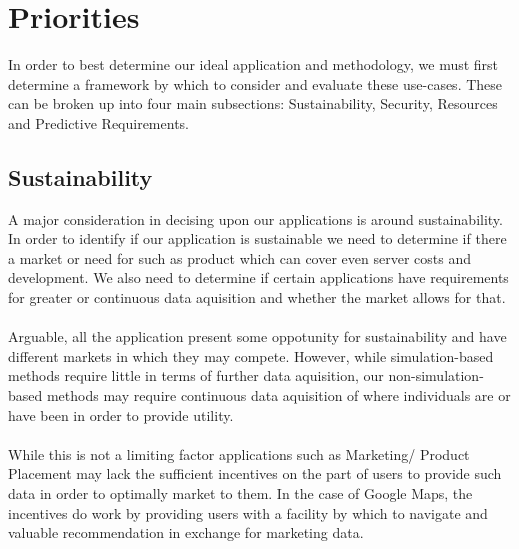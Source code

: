 \documentclass[12pt]{report}
\begin{document}
\section{Priorities}
In order to best determine our ideal application and methodology, we must first determine a framework by which to consider and evaluate these use-cases.  These can be broken up into four main subsections: Sustainability, Security, Resources and Predictive Requirements.  

\subsection{Sustainability}  
A major consideration in decising upon our applications is around sustainability. In order to identify if our application is sustainable we need to determine if there a market or need for such as product which can cover even server costs and development. We also need  to determine if certain applications have requirements for greater or continuous data aquisition and whether the market allows for that.  \\
\\
Arguable, all the application present some oppotunity for sustainability and have different markets in which they may compete.  However, while simulation-based methods require little in terms of further data aquisition, our non-simulation-based methods may require continuous data aquisition of where individuals are or have been in order to provide utility.  \\
\\
While this is not a limiting factor applications such as Marketing/ Product Placement may lack the sufficient incentives on the part of users to provide such data in order to optimally  market to them.  In the case of Google Maps, the incentives do work by providing users with a facility by which to navigate and valuable recommendation in exchange for marketing data.  \\
\end{document}
